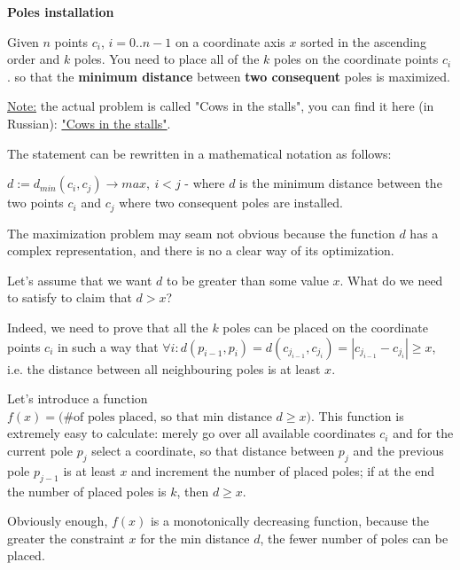 
\begin{problem}\textbf{Poles installation}

    Given $n$ points $c_i$, $i=0..n-1$ on a coordinate axis $x$ sorted in the ascending order and $k$ poles. You need to place all of the $k$ poles on the coordinate points $c_i$. so that the \textbf{minimum distance} between \textbf{two consequent} poles is maximized.

    \underline{Note:} the actual problem is called "Cows in the stalls", you can find it here (in Russian): \href{https://ru.algorithmica.org/cs/interactive/answer-search/}{"Cows in the stalls"}.

\end{problem}


\begin{solution}

    The statement can be rewritten in a mathematical notation as follows:

    $d := d_{min}(c_i, c_j) \to max, \ i < j$ - where $d$ is the minimum distance between the two points $c_i$ and $c_j$ where two consequent poles are installed.

    The maximization problem may seam not obvious because the function $d$ has a complex representation, and there is no a clear way of its optimization.

    Let's assume that we want $d$ to be greater than some value $x$. What do we need to satisfy to claim that $d > x$?

    Indeed, we need to prove that all the $k$ poles can be placed on the coordinate points $c_i$ in such a way that $\forall i: d(p_{i-1}, p_{i}) = d(c_{j_{i-1}}, c_{j_i}) = |c_{j_{i-1}} - c_{j_i}| \geq x$, i.e. the distance between all neighbouring poles is at least $x$.

    Let's introduce a function $f(x) = \text{(\# of poles placed, so that min distance $d \geq x$)}$. This function is extremely easy to calculate: merely go over all available coordinates $c_i$ and for the current pole $p_j$ select a coordinate, so that distance between $p_j$ and the previous pole $p_{j-1}$ is at least $x$ and increment the number of placed poles; if at the end the number of placed poles is $k$, then $d \geq x$.

    Obviously enough, $f(x)$ is a monotonically decreasing function, because the greater the constraint $x$ for the min distance $d$, the fewer number of poles can be placed.


\end{solution}
